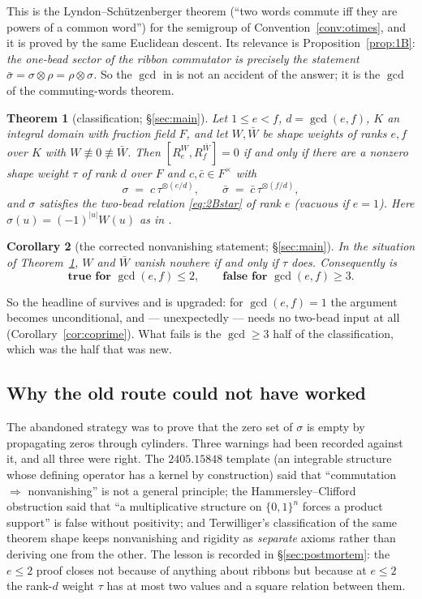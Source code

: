 \documentclass[11pt]{article}
\newtheorem{theorem}{Theorem}[section]
\newtheorem{corollary}[theorem]{Corollary}
\theoremstyle{definition}
\theoremstyle{remark}
\begin{document}
This is the Lyndon--Schützenberger theorem (``two words commute iff they are powers of a
common word'') for the semigroup of Convention~\ref{conv:otimes}, and it is proved by the
same Euclidean descent.  Its relevance is Proposition~\ref{prop:1B}: \emph{the one-bead
sector of the ribbon commutator is precisely the statement $\bar\sigma=\sigma\otimes\rho
=\rho\otimes\sigma$.}  So the $\gcd$ in \cite[Thm.~5.2]{Q149} is not an accident of the
answer; it is the $\gcd$ of the commuting-words theorem.

\begin{theorem}[classification; §\ref{sec:main}]\label{thm:main0}
Let $1\le e<f$, $d=\gcd(e,f)$, $K$ an integral domain with fraction field $F$, and let
$W,\bar W$ be shape weights of ranks $e,f$ over $K$ with $W\not\equiv0\not\equiv\bar W$.
Then $[R_e^{W},R_f^{\bar W}]=0$ if and only if there are a nonzero shape weight $\tau$ of
rank $d$ over $F$ and $c,\bar c\in F^{\times}$ with
\[
   \sigma \;=\; c\,\tau^{\otimes(e/d)},\qquad
   \bar\sigma \;=\; \bar c\,\tau^{\otimes(f/d)},
\]
and $\sigma$ satisfies the two-bead relation \eqref{eq:2Bstar} of rank $e$ (vacuous if
$e=1$).  Here $\sigma(u)=(-1)^{|u|}W(u)$ as in \cite[Conv.~2.1]{Q149}.
\end{theorem}

\begin{corollary}[the corrected nonvanishing statement; §\ref{sec:main}]\label{cor:main0}
In the situation of Theorem~\ref{thm:main0}, $W$ and $\bar W$ vanish nowhere if and only if
$\tau$ does.  Consequently \cite[Lemma 8.2]{Q149} is
\[
  \textbf{true for } \gcd(e,f)\le2, \qquad \textbf{false for } \gcd(e,f)\ge3 .
\]
\end{corollary}

So the headline of \cite{Q149} survives and is upgraded: for $\gcd(e,f)=1$ the argument
becomes unconditional, and --- unexpectedly --- needs no two-bead input at all
(Corollary~\ref{cor:coprime}).  What fails is the $\gcd\ge3$ half of the classification,
which was the half that was new.

\subsection*{Why the old route could not have worked}

The abandoned strategy was to prove that the zero set of $\sigma$ is empty by propagating
zeros through cylinders.  Three warnings had been recorded against it, and all three were
right.  The $2405.15848$ template (an integrable structure whose defining operator has a
kernel by construction) said that ``commutation $\Rightarrow$ nonvanishing'' is not a general
principle; the Hammersley--Clifford obstruction said that ``a multiplicative structure on
$\{0,1\}^n$ forces a product support'' is false without positivity; and Terwilliger's
classification of the same theorem shape keeps nonvanishing and rigidity as \emph{separate}
axioms rather than deriving one from the other.  The lesson is recorded in
§\ref{sec:postmortem}: the $e\le2$ proof closes not because of anything about ribbons but
because at $e\le2$ the rank-$d$ weight $\tau$ has at most two values and a square relation
between them.
\end{document}
